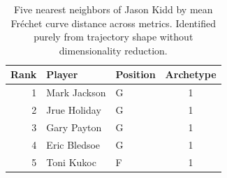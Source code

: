 \begin{table}[htbp]
  \centering\small
  \begin{tabular}{rllc}
    \toprule
    Rank & Player & Position & Archetype \\
    \midrule
    1 & Mark Jackson & G & 1 \\
    2 & Jrue Holiday & G & 1 \\
    3 & Gary Payton & G & 1 \\
    4 & Eric Bledsoe & G & 1 \\
    5 & Toni Kukoc & F & 1 \\
    \bottomrule
  \end{tabular}
  \caption{Five nearest neighbors of Jason Kidd by mean Fr\'{e}chet curve distance across metrics. Identified purely from trajectory shape without dimensionality reduction.}
  \label{tab:Jason_Kidd_frechet_curve_neighbors}
\end{table}

